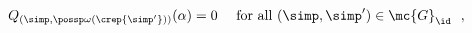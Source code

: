 \begin{equation}\label{selrules}
Q_{(\simp ,\possp \omega (\crep{\simp'} ))} (\alpha )=0 \quad \text{ for all }
(\simp ,\simp ')\in \mc{G}_{\id }\ \ ,
\end{equation}

